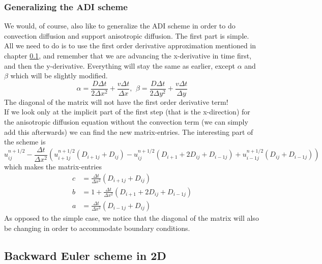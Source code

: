\subsubsection{Generalizing the ADI scheme}
We would, of course, also like to generalize the ADI scheme in order to do convection diffusion and support anisotropic diffusion. The first part is simple. All we need to do is to use the first order derivative approximation mentioned in chapter \ref{}, and remember that we are advancing the x-derivative in time first, and then the y-derivative. Everything will stay the same as earlier, except $\alpha$ and $\beta$ which will be slightly modified.
\begin{equation}
 \alpha = \frac{D\Delta t}{2\Delta x^2}+\frac{v\Delta t}{\Delta x}\text{,}\;\;  \beta = \frac{D\Delta t}{2\Delta y^2}+\frac{v\Delta t}{\Delta y}
\end{equation}
The diagonal of the matrix will not have the first order derivative term!\\
If we look only at the implicit part of the first step (that is the x-direction) for the anisotropic diffusion equation without the convection term (we can simply add this afterwards) we can find the new matrix-entries. 
The interesting part of the scheme is
\begin{equation*}
 u^{n+1/2}_{ij} -\frac{\Delta t}{\Delta x^2}\left( u^{n+1/2}_{i+1j}(D_{i+1j}+D_{ij}) - u^{n+1/2}_{ij}(D_{i+1}+2D_{ij}+D_{i-1j}) + u^{n+1/2}_{i-1j}(D_{ij}+D_{i-1j})\right) 
\end{equation*}
which makes the matrix-entries 
\begin{align*}
 c &= \frac{\Delta t}{\Delta x^2}(D_{i+1j}+D_{ij})\\
 b &= 1+\frac{\Delta t}{\Delta x^2}(D_{i+1}+2D_{ij}+D_{i-1j})\\
 a &= \frac{\Delta t}{\Delta x^2}(D_{i-1j}+D_{ij})
\end{align*}
As opposed to the simple case, we notice that the diagonal of the matrix will also be changing in order to accommodate boundary conditions.

\subsection{Backward Euler scheme in 2D}

